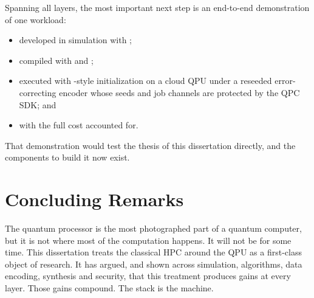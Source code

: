 Spanning all layers, the most important next step is an end-to-end demonstration of one workload:
\begin{itemize}
  \item developed in simulation with \qgear;
  \item compiled with \shardq{} and \rubriq;
  \item executed with \deal-style initialization on a cloud QPU under a reseeded error-correcting encoder whose seeds and job channels are protected by the QPC SDK; and
  \item with the full cost accounted for.
\end{itemize}
That demonstration would test the thesis of this dissertation directly, and the components to build it now exist.

\section{Concluding Remarks}\label{sec:conclusion:remarks}

The quantum processor is the most photographed part of a quantum computer, but it is not where most of the computation happens. It will not be for some time. This dissertation treats the classical HPC around the QPU as a first-class object of research. It has argued, and shown across simulation, algorithms, data encoding, synthesis and security, that this treatment produces gains at every layer. Those gains compound. The stack is the machine.
